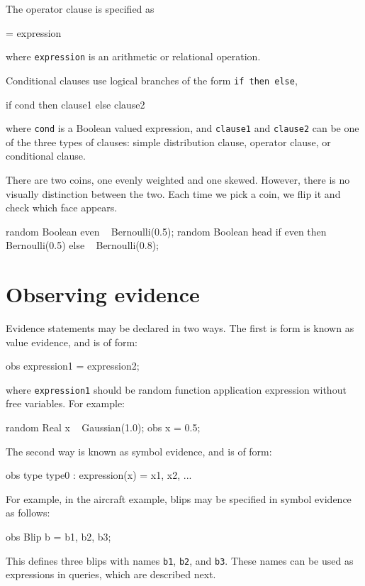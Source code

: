 \documentclass[12pt]{article}
\begin{document}
The operator clause is specified as
\begin{blogcode}
= expression
\end{blogcode}
where \texttt{expression} is an arithmetic or relational operation. 

Conditional clauses use logical branches of the form \texttt{if then else}, 
\begin{blogcode}
if cond then clause1
else clause2
\end{blogcode}
where \texttt{cond} is a Boolean valued expression, and \texttt{clause1} and \texttt{clause2} can be one of the three types of clauses:
simple distribution clause, operator clause, or conditional clause. 

\begin{example}
There are two coins, one evenly weighted and one skewed. However, there is no visually distinction between the two. Each time we pick a coin, we flip it
and check which face appears.
\end{example}
\begin{blogcode}
random Boolean even ~ Bernoulli(0.5);
random Boolean head 
  if even then ~ Bernoulli(0.5)
  else ~ Bernoulli(0.8);
\end{blogcode}

\section{Observing evidence}
Evidence statements may be declared in two ways.  The first is form is known as value evidence, and is of form:
\begin{blogcode}
obs expression1 = expression2;
\end{blogcode}
where \texttt{expression1} should be random function application expression without free variables.  For example:
\begin{blogcode}
random Real x ~ Gaussian(1.0);
obs x = 0.5;
\end{blogcode}

The second way is known as symbol evidence, and is of form:
\begin{blogcode}
obs {type type0 : expression(x)} = { x1, x2, ...}
\end{blogcode}

For example, in the aircraft example, blips may be specified in symbol evidence as follows:
\begin{blogcode}
obs {Blip b} = {b1, b2, b3};
\end{blogcode}
This defines three blips with names \texttt{b1}, \texttt{b2}, and \texttt{b3}.  These names can be used as expressions in queries, which are described next.
\end{document}
